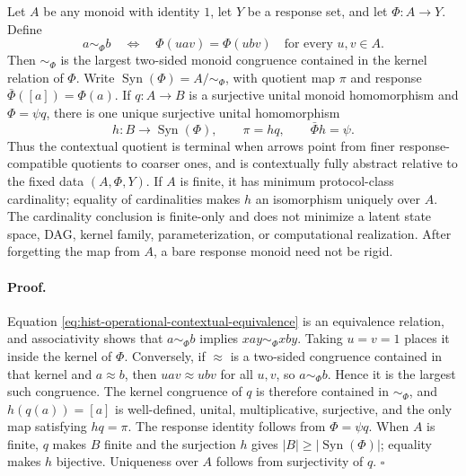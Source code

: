Let \(A\) be any monoid with identity \(1\), let \(Y\) be a response set,
and let \(\Phi:A\to Y\).  Define
\begin{equation}
a\sim_\Phi b
\quad\Longleftrightarrow\quad
\Phi(uav)=\Phi(ubv)
\quad\text{for every }u,v\in A.
\label{eq:hist-operational-contextual-equivalence}
\end{equation}
Then \(\sim_\Phi\) is the largest two-sided monoid congruence contained in
the kernel relation of \(\Phi\).  Write
\(\operatorname{Syn}(\Phi)=A/{\sim_\Phi}\), with quotient map \(\pi\) and
response \(\bar\Phi([a])=\Phi(a)\).  If
\(q:A\to B\) is a surjective unital monoid homomorphism and
\(\Phi=\psi q\), there is one unique surjective unital homomorphism
\begin{equation}
h:B\longrightarrow\operatorname{Syn}(\Phi),
\qquad
\pi=hq,
\qquad
\bar\Phi h=\psi.
\label{eq:hist-operational-quotient-factor}
\end{equation}
Thus the contextual quotient is terminal when arrows point from finer
response-compatible quotients to coarser ones, and is contextually fully
abstract relative to the fixed data \((A,\Phi,Y)\).  If \(A\) is finite, it
has minimum protocol-class cardinality; equality of cardinalities makes
\(h\) an isomorphism uniquely over \(A\).  The cardinality conclusion is
finite-only and does not minimize a latent state space, DAG, kernel family,
parameterization, or computational realization.  After forgetting the map
from \(A\), a bare response monoid need not be rigid.  

\paragraph{Proof.}
Equation \eqref{eq:hist-operational-contextual-equivalence} is an equivalence
relation, and associativity shows that \(a\sim_\Phi b\) implies
\(xay\sim_\Phi xby\).  Taking \(u=v=1\) places it inside the kernel of
\(\Phi\).  Conversely, if \(\approx\) is a two-sided congruence contained in
that kernel and \(a\approx b\), then \(uav\approx ubv\) for all \(u,v\), so
\(a\sim_\Phi b\).  Hence it is the largest such congruence.  The kernel
congruence of \(q\) is therefore contained in \(\sim_\Phi\), and
\(h(q(a))=[a]\) is well-defined, unital, multiplicative, surjective, and the
only map satisfying \(hq=\pi\).  The response identity follows from
\(\Phi=\psi q\).  When \(A\) is finite, \(q\) makes \(B\) finite and the
surjection \(h\) gives
\(|B|\geq|\operatorname{Syn}(\Phi)|\); equality makes \(h\) bijective.
Uniqueness over \(A\) follows from surjectivity of \(q\).  \(\square\)

